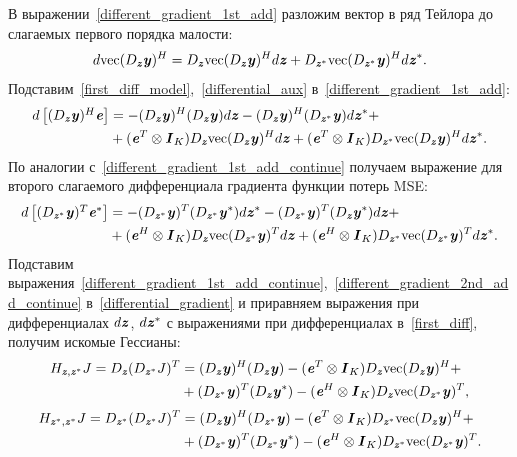 В выражении~\eqref{different_gradient_1st_add} разложим вектор в ряд Тейлора до слагаемых первого порядка малости:
\begin{equation}
	d\text{vec}(D_{\bit{z}}\bit{y})^H=D_{\bit{z}}\text{vec}(D_{\bit{z}}\bit{y})^Hd\bit{z}+D_{\bit{z}^*}\text{vec}(D_{\bit{z}^*}\bit{y})^Hd\bit{z}^*.
	\label{differential_aux}
\end{equation}
Подставим~\eqref{first_diff_model},~\eqref{differential_aux} в~\eqref{different_gradient_1st_add}:
\begin{align}
	d\begin{bmatrix}
		(D_{\bit{z}}\bit{y})^H\bit{e}
	\end{bmatrix}&=
	-(D_{\bit{z}}\bit{y})^H(D_{\bit{z}}\bit{y})d\bit{z}-
	(D_{\bit{z}}\bit{y})^H(D_{\bit{z}^*}\bit{y})d\bit{z}^*+ \nonumber \\
	&+(\bit{e}^T\otimes\bit{I}_{K})D_{\bit{z}}\text{vec}(D_{\bit{z}}\bit{y})^Hd\bit{z}+
	(\bit{e}^T\otimes\bit{I}_{K})D_{\bit{z}^*}\text{vec}(D_{\bit{z}}\bit{y})^Hd\bit{z}^*.
	\label{different_gradient_1st_add_continue}
\end{align}
По аналогии с~\eqref{different_gradient_1st_add_continue} получаем выражение для второго слагаемого дифференциала градиента функции потерь MSE:
\begin{align}
	d\begin{bmatrix}
		(D_{\bit{z}^*}\bit{y})^T\bit{e}^*
	\end{bmatrix}&=
	-(D_{\bit{z}^*}\bit{y})^T(D_{\bit{z}^*}\bit{y}^*)d\bit{z}^*-
	(D_{\bit{z}^*}\bit{y})^T(D_{\bit{z}}\bit{y}^*)d\bit{z}+ \nonumber \\
	&+(\bit{e}^H\otimes\bit{I}_{K})D_{\bit{z}}\text{vec}(D_{\bit{z}^*}\bit{y})^Td\bit{z}+
	(\bit{e}^H\otimes\bit{I}_{K})D_{\bit{z}^*}\text{vec}(D_{\bit{z}^*}\bit{y})^Td\bit{z}^*.
	\label{different_gradient_2nd_add_continue}
\end{align}
Подставим выражения~\eqref{different_gradient_1st_add_continue},~\eqref{different_gradient_2nd_add_continue} в~\eqref{differential_gradient} и приравняем выражения при дифференциалах $d\bit{z}$, $d\bit{z}^*$ с выражениями при дифференциалах в~\eqref{first_diff}, получим искомые Гессианы:
\begin{align}
	H_{\bit{z}, \bit{z}^*}J=D_{\bit{z}}(D_{\bit{z}^*}J)^T&=
	(D_{\bit{z}}\bit{y})^H(D_{\bit{z}}\bit{y})-
	(\bit{e}^T\otimes\bit{I}_{K})D_{\bit{z}}\text{vec}(D_{\bit{z}}\bit{y})^H+ \nonumber \\
	&+(D_{\bit{z}^*}\bit{y})^T(D_{\bit{z}}\bit{y}^*)-(\bit{e}^H\otimes\bit{I}_{K})D_{\bit{z}}\text{vec}(D_{\bit{z}^*}\bit{y})^T,
	\label{hessians_mixed}
\end{align}
\begin{align}
	H_{\bit{z}^*, \bit{z}^*}J=D_{\bit{z}^*}(D_{\bit{z}^*}J)^T&=
	(D_{\bit{z}}\bit{y})^H(D_{\bit{z}^*}\bit{y})-
	(\bit{e}^T\otimes\bit{I}_{K})D_{\bit{z}^*}\text{vec}(D_{\bit{z}}\bit{y})^H+ \nonumber \\
	&+(D_{\bit{z}^*}\bit{y})^T(D_{\bit{z}^*}\bit{y}^*)-(\bit{e}^H\otimes\bit{I}_{K})D_{\bit{z}^*}\text{vec}(D_{\bit{z}^*}\bit{y})^T.
	\label{hessians_nonmixed}
\end{align}

